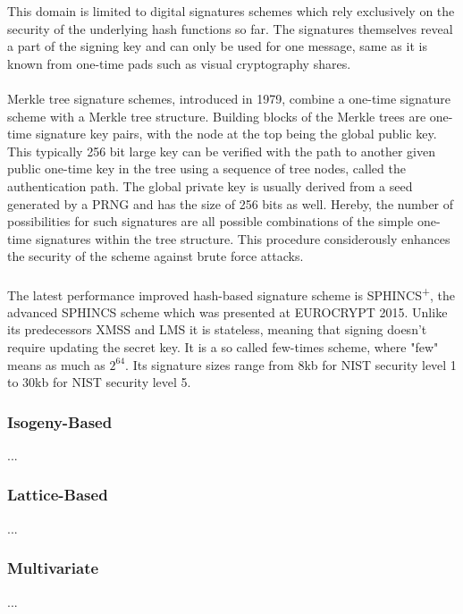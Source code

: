\documentclass[a4paper,11pt]{article}
\begin{document}
\begin{multicols}{2}
This domain is limited to digital signatures schemes which rely exclusively on the security of the underlying hash functions so far. The signatures themselves reveal a part of the signing key and can only be used for one message, same as it is known from one-time pads such as visual cryptography shares. \\
\\
Merkle tree signature schemes, introduced in 1979, combine a one-time signature scheme with a Merkle tree structure. Building blocks of the Merkle trees are one-time signature key pairs, with the node at the top being the global public key. This typically 256 bit large key can be verified with the path to another given public one-time key in the tree using a sequence of tree nodes, called the authentication path. The global private key is usually derived from a seed generated by a PRNG and has the size of 256 bits as well.
Hereby, the number of possibilities for such signatures are all possible combinations of the simple one-time signatures within the tree structure. This procedure considerously enhances the security of the scheme against brute force attacks. \\
\\
The latest performance improved hash-based signature scheme is SPHINCS\textsuperscript{+}, the advanced SPHINCS scheme which was presented at EUROCRYPT 2015. Unlike its predecessors XMSS and LMS it is stateless, meaning that signing doesn't require updating the secret key. It is a so called few-times scheme, where "few" means as much as $2^{64}$. Its signature sizes range from 8kb for NIST security level 1 to 30kb for NIST security level 5.\\


\subsubsection{Isogeny-Based}
...

\subsubsection{Lattice-Based}
...

\subsubsection{Multivariate}
...



\end{multicols}

 
\end{document}
